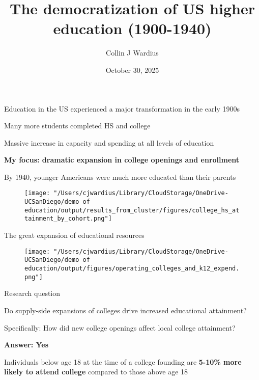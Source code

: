 \documentclass[notes,11pt, aspectratio=169]{beamer}
\title[]{The democratization of US higher education (1900-1940)}
\author{Collin J Wardius} %
\institute{
  Department of Economics, UC San Diego
  \newline
  Read by Fabian E, Gaurav, and Julian
}
\date[]{October 30, 2025}
\newenvironment{wideitemize}{\itemize\addtolength{\itemsep}{10pt}}{\enditemize}
\begin{document}
\begin{frame}
  \titlepage
\end{frame}

\begin{frame}{Education in the US experienced a major transformation in the early 1900s}
 \begin{wideitemize}
\item Many more students completed HS and college
\item Massive increase in capacity and spending at all levels of education
\item \textbf{My focus: dramatic expansion in college openings and enrollment}
\end{wideitemize}
\end{frame}

\begin{frame}{By 1940, younger Americans were much more educated than their parents}
  \begin{figure}
        \centering
        \texttt{[image: "/Users/cjwardius/Library/CloudStorage/OneDrive-UCSanDiego/demo of education/output/results\_from\_cluster/figures/college\_hs\_attainment\_by\_cohort.png"]}
    \end{figure}
\end{frame}



\begin{frame}{The great expansion of educational resources}
  \begin{figure}
        \centering
        \texttt{[image: "/Users/cjwardius/Library/CloudStorage/OneDrive-UCSanDiego/demo of education/output/figures/operating\_colleges\_and\_k12\_expend.png"]}
    \end{figure}
\end{frame}

\begin{frame}{Research question}
\begin{wideitemize}
\item Do supply-side expansions of colleges drive increased educational attainment?
\item Specifically: How did new college openings affect local college attainment?
\item \textbf{Answer: Yes}
\item Individuals below age 18 at the time of a college founding are \textbf{5-10\% more likely to attend college} compared to those above age 18
\end{wideitemize}
\end{frame}
\end{document}
